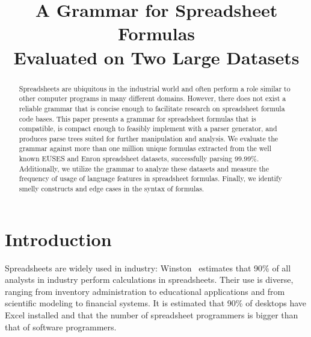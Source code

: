 \documentclass[conference]{IEEEtran}
\begin{document}
\title{A Grammar for Spreadsheet Formulas\\Evaluated on Two Large Datasets}

\author{
}
\maketitle

\begin{abstract}
Spreadsheets are ubiquitous in the industrial world and often perform a role similar to other computer programs in many different domains.
However, there does not exist a reliable grammar that is concise enough to facilitate research on spreadsheet formula code bases.
This paper presents a grammar for spreadsheet formulas that is compatible, is compact enough to feasibly implement with a parser generator, and produces parse trees suited for further manipulation and analysis. 
We evaluate the grammar against more than one million unique formulas extracted from the well known EUSES and Enron spreadsheet datasets, successfully parsing 99.99\%.
Additionally, we utilize the grammar to analyze these datasets and measure the frequency of usage of language features in spreadsheet formulas.
Finally, we identify smelly constructs and edge cases in the syntax of formulas.
\end{abstract}

\IEEEpeerreviewmaketitle

\section{Introduction}
Spreadsheets are widely used in industry: Winston~\cite{Wins2001} estimates that 90\% of all analysts in industry perform calculations in
spreadsheets. Their use is diverse, ranging from inventory administration to educational applications and from scientific
modeling to financial systems. It is estimated that 90\% of desktops have Excel installed\cite{DBLP:conf/icse/BradleyM09} and that the number of spreadsheet programmers is bigger than that of software programmers\cite{DBLP:conf/vl/ScaffidiSM05}. 
\end{document}
